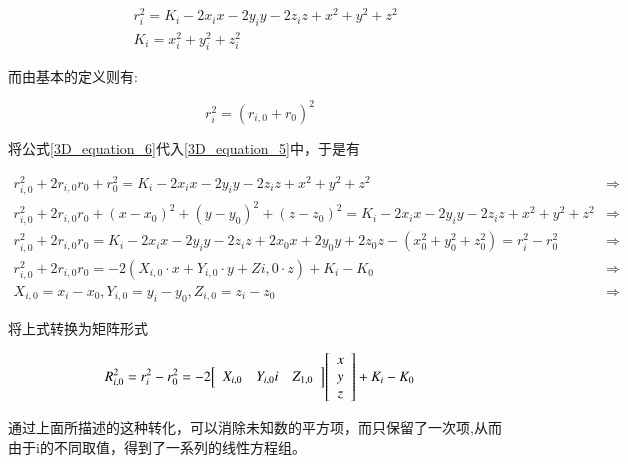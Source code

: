 \documentclass[winfonts]{njuthesis}
\begin{document}
		\begin{equation}  
		\begin{aligned}
		& r_i^2 = K_i - 2x_ix - 2y_iy - 2z_iz + x^2 + y^2 + z^2 \label{3D_equation_5}\\
		& K_i = x_i^2 + y_i^2 + z_i^2
		\end{aligned}
		\end{equation}
		
		而由基本的定义则有:
		
		\begin{equation}  
			r_i^2 = (r_{i,0}+r_0)^2 \label{3D_equation_6}
		\end{equation}
		
		将公式\ref{3D_equation_6}代入\ref{3D_equation_5}中，于是有
		
		\begin{equation}
		\begin{aligned}
			r_{i,0}^2 + 2r_{i,0}r_0 + r_0^2 = K_i - 2x_ix - 2y_iy - 2z_iz + x^2 + y^2 + z^2 & \Longrightarrow\\
			r_{i,0}^2 + 2r_{i,0}r_0 + (x-x_0)^2 + (y-y_0)^2 + (z-z_0)^2 = K_i - 2x_ix - 2y_iy - 2z_iz + x^2 + y^2 + z^2 & \Longrightarrow\\
			r_{i,0}^2 + 2r_{i,0}r_0 = K_i - 2x_ix - 2y_iy - 2z_iz + 2x_0x + 2y_0y + 2z_0z - (x_0^2 + y_0^2 + z_0^2) = r_i^2 - r_0^2 & \Longrightarrow\\
			r_{i,0}^2 + 2r_{i,0}r_0 = -2(X_{i,0}\cdot x + Y_{i,0}\cdot y + Z{i,0}\cdot z) + K_i - K_0 & \Longrightarrow\\
			X_{i,0} = x_i - x_0,  Y_{i,0} = y_i - y_0,  Z_{i,0} = z_i - z_0 & \Longrightarrow
		\end{aligned}
		\end{equation}
		
		将上式转换为矩阵形式
		
		\begin{equation}
			R_{i,0}^2 = r_i^2 - r_0^2 = -2{
			\left[ 
			\begin{array}{c c c}
				X_{i,0} & Y_{i,0} i & Z_{1,0}
			\end{array} 
			\right ]}{
			\left[ 
			\begin{array}{c}
				x\\
				y\\
				z
			\end{array}
			\right ]} + K_i - K_0
		\end{equation}
		
		通过上面所描述的这种转化，可以消除未知数的平方项，而只保留了一次项,从而由于i的不同取值，得到了一系列的线性方程组。
		
\end{document}
